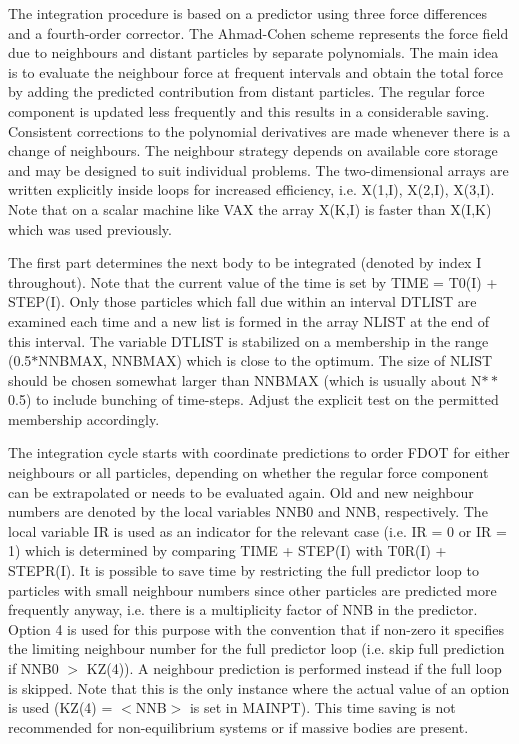 The integration procedure is based on a predictor using three force differences
 and a fourth-order corrector.  The Ahmad-Cohen scheme represents the force
 field due to neighbours and distant particles by separate polynomials.  The
 main idea is to evaluate the neighbour force at frequent intervals and
 obtain the total force by adding the predicted contribution from distant
 particles.  The regular force component is updated less frequently and this
 results in a considerable saving.  Consistent corrections to the polynomial
 derivatives are made whenever there is a change of neighbours.  The neighbour
 strategy depends on available core storage and may be designed to suit
 individual problems.  The two-dimensional arrays are written explicitly inside
 loops for increased efficiency, i.e. X(1,I), X(2,I), X(3,I).  Note that
 on a scalar machine like VAX the array X(K,I)
 is faster than X(I,K) which was used previously.

  The first part determines the next body to be integrated (denoted by index I
 throughout).  Note that the current value of the time is set by
 TIME = T0(I) + STEP(I).  Only those particles which
 fall due within an interval DTLIST are examined each time and a new list is
 formed in the array NLIST at the end of this interval.  The variable DTLIST is
 stabilized on a membership in the range (0.5$\ast$NNBMAX, NNBMAX) which is
 close to the optimum.  The size of NLIST should be chosen somewhat
 larger than NNBMAX (which is usually about N$\ast\ast$0.5) to include bunching
 of time-steps.  Adjust the explicit test on the permitted membership
 accordingly.

            The integration cycle starts with coordinate predictions to
 order FDOT for either neighbours or all particles,
 depending on whether the regular force component
 can be extrapolated or needs to be evaluated again.  Old and new
 neighbour numbers are denoted by the local variables NNB0 and NNB,
 respectively.  The local
 variable IR is used as an indicator for the relevant case (i.e. IR = 0 or
  IR = 1) which is determined by comparing TIME + STEP(I) with
 T0R(I) + STEPR(I).  It is possible
 to save time by restricting the full predictor loop to particles with small
 neighbour numbers since other particles are predicted more frequently anyway,
 i.e. there is a multiplicity factor of NNB in the predictor.  Option
 4 is used for this purpose with the convention that if non-zero it specifies
 the limiting neighbour number for the full predictor loop (i.e. skip full
 prediction if NNB0 $>$ KZ(4)).  A neighbour
 prediction is performed instead if the full loop is skipped.  Note that this is
 the only instance where the actual value of an option is used
 (KZ(4) = $<$NNB$>$ is set in MAINPT).  This time
 saving is not recommended for non-equilibrium systems or if massive bodies are
 present.

